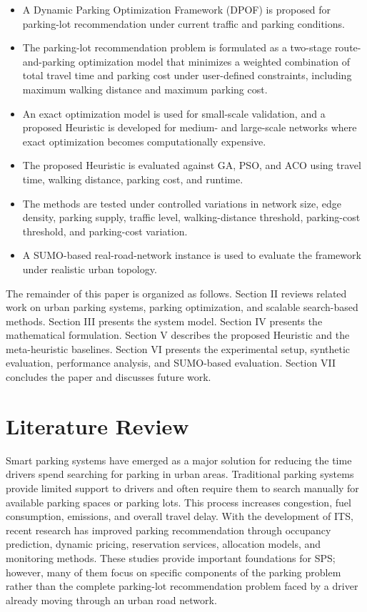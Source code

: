 \begin{itemize}
\item A Dynamic Parking Optimization Framework (DPOF) is proposed for parking-lot recommendation under current traffic and parking conditions.
\item The parking-lot recommendation problem is formulated as a two-stage route-and-parking optimization model that minimizes a weighted combination of total travel time and parking cost under user-defined constraints, including maximum walking distance and maximum parking cost.
\item An exact optimization model is used for small-scale validation, and a proposed Heuristic is developed for medium- and large-scale networks where exact optimization becomes computationally expensive.
\item The proposed Heuristic is evaluated against GA, PSO, and ACO using travel time, walking distance, parking cost, and runtime.
\item The methods are tested under controlled variations in network size, edge density, parking supply, traffic level, walking-distance threshold, parking-cost threshold, and parking-cost variation.
\item A SUMO-based real-road-network instance is used to evaluate the framework under realistic urban topology.
\end{itemize}

The remainder of this paper is organized as follows. Section II reviews related work on urban parking systems, parking optimization, and scalable search-based methods. Section III presents the system model. Section IV presents the mathematical formulation. Section V describes the proposed Heuristic and the meta-heuristic baselines. Section VI presents the experimental setup, synthetic evaluation, performance analysis, and SUMO-based evaluation. Section VII concludes the paper and discusses future work.

\section{Literature Review}

Smart parking systems have emerged as a major solution for reducing the time drivers spend searching for parking in urban areas. Traditional parking systems provide limited support to drivers and often require them to search manually for available parking spaces or parking lots. This process increases congestion, fuel consumption, emissions, and overall travel delay. With the development of ITS, recent research has improved parking recommendation through occupancy prediction, dynamic pricing, reservation services, allocation models, and monitoring methods. These studies provide important foundations for SPS; however, many of them focus on specific components of the parking problem rather than the complete parking-lot recommendation problem faced by a driver already moving through an urban road network.

